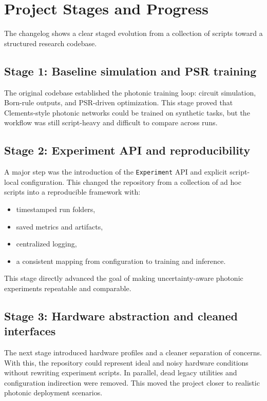 \documentclass[11pt,a4paper]{article}
\begin{document}
\section{Project Stages and Progress}

The changelog shows a clear staged evolution from a collection of scripts toward a structured research codebase.

\subsection{Stage 1: Baseline simulation and PSR training}
The original codebase established the photonic training loop: circuit simulation, Born-rule outputs, and PSR-driven optimization. This stage proved that Clements-style photonic networks could be trained on synthetic tasks, but the workflow was still script-heavy and difficult to compare across runs.

\subsection{Stage 2: Experiment API and reproducibility}
A major step was the introduction of the \texttt{Experiment} API and explicit script-local configuration. This changed the repository from a collection of ad hoc scripts into a reproducible framework with:
\begin{itemize}[leftmargin=*]
    \item timestamped run folders,
    \item saved metrics and artifacts,
    \item centralized logging,
    \item a consistent mapping from configuration to training and inference.
\end{itemize}
This stage directly advanced the goal of making uncertainty-aware photonic experiments repeatable and comparable.

\subsection{Stage 3: Hardware abstraction and cleaned interfaces}
The next stage introduced hardware profiles and a cleaner separation of concerns. With this, the repository could represent ideal and noisy hardware conditions without rewriting experiment scripts. In parallel, dead legacy utilities and configuration indirection were removed. This moved the project closer to realistic photonic deployment scenarios.
\end{document}
